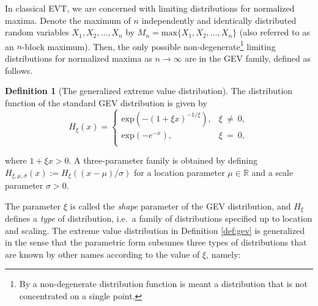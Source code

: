 \documentclass[a4paper,11pt]{article}
\theoremstyle{definition}
\newtheorem{definition}{Definition}[section]
\theoremstyle{definition}
\theoremstyle{definition}
\theoremstyle{definition}
\theoremstyle{remark}
\begin{document}
In classical EVT, we are concerned with limiting distributions for normalized maxima. Denote the maximum of \(n\) independently and identically distributed random variables \(X_1, X_2, \dots,X_n\) by \(M_n = \text{max}\{X_1,X_2,\dots, X_n\}\) (also referred to as an \(n\)-block maximum). Then, the only possible non-degenerate\footnote{By a non-degenerate distribution function is meant a distribution that is not concentrated on a single point.} limiting distributions for normalized maxima as \(n \rightarrow \infty\) are in the GEV family, defined as follows.
\begin{definition}[The generalized extreme value distribution]
\protect\hypertarget{def:gev}{}{\label{def:gev} {} }
The distribution function of the standard GEV distribution is given by
\begin{equation}
H_{\xi}(x) = 
\begin{cases}
\text{exp}(-(1 +\xi x)^{-1/\xi}) , &  \xi \ \neq\ 0, \\
\text{exp}(-e^{-x}), & \xi \ =\ 0, \\ 
\end{cases}
\label{eq:gev}
\end{equation}
\end{definition}
where \(1 + \xi x > 0\). A three-parameter family is obtained by defining \(H_{\xi, \mu, \sigma}(x):= H_{\xi}((x-\mu)/\sigma)\) for a location parameter \(\mu \in \mathbb R\) and a scale parameter \(\sigma > 0\).

The parameter \(\xi\) is called the \emph{shape} parameter of the GEV distribution, and \(H_\xi\) defines a \emph{type} of distribution, i.e.~a family of distributions specified up to location and scaling. The extreme value distribution in Definition \ref{def:gev} is generalized in the sense that the parametric form subsumes three types of distributions that are known by other names according to the value of \(\xi\), namely:
\end{document}
